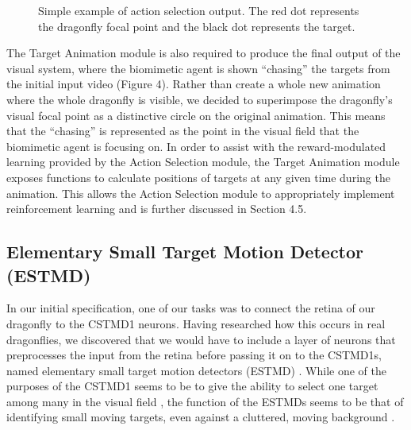 \documentclass[a4paper,11pt]{article}
\begin{document}
\begin{figure}[H]
\begin{minipage}{0.23\textwidth}
\end{minipage}
\begin{minipage}{0.23\textwidth}
\end{minipage}
\caption{Simple example of action selection output. The red dot represents the dragonfly focal point and the black dot represents the target.}
\end{figure}

The Target Animation module is also required to produce the final output of the visual system, where the biomimetic agent is shown ``chasing'' the targets from the initial input video (Figure 4). Rather than create a whole new animation where the whole dragonfly is visible, we decided to superimpose the dragonfly's visual focal point as a distinctive circle on the original animation. This means that the ``chasing'' is represented as the point in the visual field that the biomimetic agent is focusing on. In order to assist with the reward-modulated learning provided by the Action Selection module, the Target Animation module exposes functions to calculate positions of targets at any given time during the animation. This allows the Action Selection module to appropriately implement reinforcement learning and is further discussed in Section 4.5.

\subsection{Elementary Small Target Motion Detector (ESTMD)}

In our initial specification, one of our tasks was to connect the retina of our dragonfly to the CSTMD1 neurons. Having researched how this occurs in real dragonflies, we discovered that we would have to include a layer of neurons that preprocesses the input from the retina before passing it on to the CSTMD1s, named elementary small target motion detectors (ESTMD) \cite{Wiederman2008}. While one of the purposes of the CSTMD1 seems to be to give the ability to select one target among many in the visual field \cite{w13}, the function of the ESTMDs seems to be that of identifying small moving targets, even against a cluttered, moving background \cite{Wiederman2008}.
\end{document}
